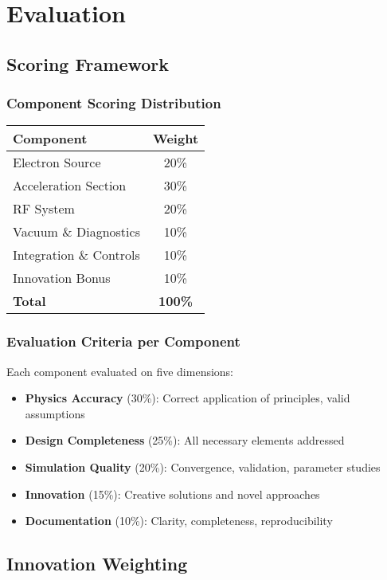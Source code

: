
\renewcommand{\thesection}{S}
\section{Evaluation}

\subsection{Scoring Framework}

\subsubsection{Component Scoring Distribution}
\begin{tabular}{lc}
\toprule
Component & Weight \\
\midrule
Electron Source & 20\% \\
Acceleration Section & 30\% \\
RF System & 20\% \\
Vacuum \& Diagnostics & 10\% \\
Integration \& Controls & 10\% \\
Innovation Bonus & 10\% \\
\midrule
\textbf{Total} & \textbf{100\%} \\
\bottomrule
\end{tabular}

\subsubsection{Evaluation Criteria per Component}
Each component evaluated on five dimensions:
\begin{itemize}[noitemsep]
    \item \textbf{Physics Accuracy} (30\%): Correct application of principles, valid assumptions
    \item \textbf{Design Completeness} (25\%): All necessary elements addressed
    \item \textbf{Simulation Quality} (20\%): Convergence, validation, parameter studies
    \item \textbf{Innovation} (15\%): Creative solutions and novel approaches
    \item \textbf{Documentation} (10\%): Clarity, completeness, reproducibility
\end{itemize}

\subsection{Innovation Weighting}

